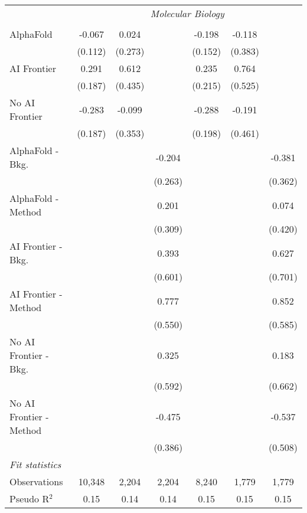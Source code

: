 \begin{tabular}{lcccccc}
 & \multicolumn{6}{c}{\textit{Molecular Biology}} \\ \\
   AlphaFold               & -0.067  & 0.024   &         & -0.198  & -0.118  &   \\   
                           & (0.112) & (0.273) &         & (0.152) & (0.383) &   \\   
   AI Frontier             & 0.291   & 0.612   &         & 0.235   & 0.764   &   \\   
                           & (0.187) & (0.435) &         & (0.215) & (0.525) &   \\   
   No AI Frontier          & -0.283  & -0.099  &         & -0.288  & -0.191  &   \\   
                           & (0.187) & (0.353) &         & (0.198) & (0.461) &   \\   
   AlphaFold - Bkg.        &         &         & -0.204  &         &         & -0.381\\   
                           &         &         & (0.263) &         &         & (0.362)\\   
   AlphaFold - Method      &         &         & 0.201   &         &         & 0.074\\   
                           &         &         & (0.309) &         &         & (0.420)\\   
   AI Frontier - Bkg.      &         &         & 0.393   &         &         & 0.627\\   
                           &         &         & (0.601) &         &         & (0.701)\\   
   AI Frontier - Method    &         &         & 0.777   &         &         & 0.852\\   
                           &         &         & (0.550) &         &         & (0.585)\\   
   No AI Frontier - Bkg.   &         &         & 0.325   &         &         & 0.183\\   
                           &         &         & (0.592) &         &         & (0.662)\\   
   No AI Frontier - Method &         &         & -0.475  &         &         & -0.537\\   
                           &         &         & (0.386) &         &         & (0.508)\\   
   \midrule
   \emph{Fit statistics}\\
   Observations            & 10,348  & 2,204   & 2,204   & 8,240   & 1,779   & 1,779\\  
   Pseudo R$^2$            & 0.15    & 0.14    & 0.14    & 0.15    & 0.15    & 0.15\\  
   

\end{tabular}
